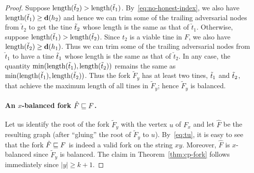 \begin{proof}
    Suppose $\operatorname{length}(\check{t}_2) > \operatorname{length}(\check{t}_1)$. 
    By~\eqref{eq:no-honest-index}, we also have $\operatorname{length}(\check{t}_1) \geq \mathbf{d}(h_2)$  
    and hence we can trim some of the trailing adversarial nodes from $\check{t}_2$ 
    to get the tine $\tilde{t}_2$ 
    whose length is the same as that of $\check{t}_1$. 
    Otherwise, suppose $\operatorname{length}(\check{t}_1) > \operatorname{length}(\check{t}_2)$. 
    Since $t_2$ is a viable tine in $F$, we also have $\operatorname{length}(\check{t}_2) \geq \mathbf{d}(h_1)$. 
    Thus we can trim some of the trailing adversarial nodes from $\check{t}_1$
    to have a tine $\tilde{t}_1$ 
    whose length is the same as that of $\check{t}_2$. 
    In any case, the quantity $\min(\operatorname{length}(\tilde{t}_1), \operatorname{length}(\tilde{t}_2))$ 
    remains the same as $\min(\operatorname{length}(\check{t}_1), \operatorname{length}(\check{t}_2))$. 
    Thus the fork $\tilde{F}_y$ has at least two tines, $\tilde{t}_1$ and $\tilde{t}_2$, that achieve the maximum length of all tines in $\tilde{F}_y$; hence $\tilde{F}_y$ is balanced.

    
    \paragraph{An $x$-balanced fork $\hat{F} \sqsubseteq F$.} 
    Let us identify the root of the fork $\tilde{F}_y$ with the vertex $u$ of $F_x$ and 
    let $\hat{F}$ be the resulting graph (after ``gluing'' the root of $\tilde{F}_y$ to $u$). 
    By~\eqref{eq:tu}, it is easy to see that the fork 
    $\hat{F} \sqsubseteq F$ 
    is indeed a valid fork on the string $x y$. 
    Moreover, $\hat{F}$ is $x$-balanced since $\tilde{F}_y$ is balanced. 
    The claim in Theorem~\ref{thm:cp-fork} follows immediately since $|y| \geq k + 1$.
  \end{proof}



